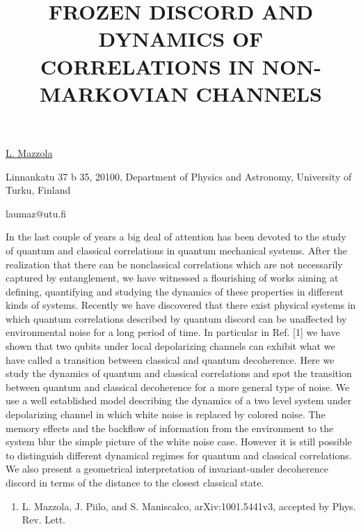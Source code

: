\title{FROZEN DISCORD AND DYNAMICS OF CORRELATIONS IN NON-MARKOVIAN CHANNELS}

\underline{L. Mazzola} 

{\normalsize{\vspace{-4mm}
Linnankatu 37 b 35, 20100, Department of Physics and Astronomy, University of Turku, Finland

\email laumaz@utu.fi}}

In the last couple of years a big deal of attention has been devoted to the study of quantum and classical correlations in quantum mechanical systems. After the realization that there can be nonclassical correlations which are not necessarily captured by entanglement, we have witnessed a flourishing of works aiming at defining, quantifying and studying the dynamics of these properties in different kinds of systems.
Recently we have discovered that there exist physical systems in which quantum correlations described by quantum discord can be unaffected by environmental noise for a long period of time. In particular in Ref. [1] we have shown that two qubits under local depolarizing channels can exhibit what we have called a transition between classical and quantum decoherence.
Here we study the dynamics of quantum and classical correlations and spot the transition between quantum and classical decoherence for a more general type of noise. We use a well established model describing the dynamics of a two level system under depolarizing channel in which white noise is replaced by colored noise. The memory effects and the backflow of information from the environment to the system blur the simple picture of the white noise case. However it is still possible to distinguish different dynamical regimes for quantum and classical correlations. We also present a geometrical interpretation of invariant-under decoherence discord in terms of the distance to the closest classical state.

\begin{enumerate}
\item L. Mazzola, J. Piilo, and S. Maniscalco, arXiv:1001.5441v3, accepted by Phys. Rev. Lett.
\end{enumerate}

\vspace{\baselineskip} 